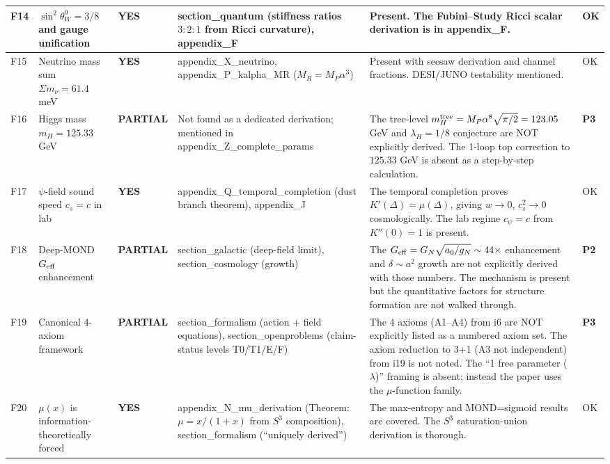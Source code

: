 \documentclass[11pt,a4paper]{article}
\newcommand{\YES}{\textcolor{yes}{\textbf{YES}}}
\newcommand{\PARTIAL}{\textcolor{partial}{\textbf{PARTIAL}}}
\begin{document}
\begin{longtable}{|p{0.5cm}|p{3.5cm}|p{1.2cm}|p{3.5cm}|p{4.5cm}|p{1cm}|}
F14 & $\sin^2\theta_W^0 = 3/8$ and gauge unification &
\YES &
section\_quantum (stiffness ratios $3:2:1$ from Ricci curvature), appendix\_F &
Present. The Fubini--Study Ricci scalar derivation is in appendix\_F. &
OK \\
\hline

F15 & Neutrino mass sum $\Sigma m_\nu = 61.4$ meV &
\YES &
appendix\_X\_neutrino, appendix\_P\_kalpha\_MR ($M_R = M_P\alpha^3$) &
Present with seesaw derivation and channel fractions. DESI/JUNO testability mentioned. &
OK \\
\hline

F16 & Higgs mass $m_H = 125.33$ GeV &
\PARTIAL &
Not found as a dedicated derivation; mentioned in appendix\_Z\_complete\_params &
The tree-level $m_H^{\rm tree} = M_P\alpha^8\sqrt{\pi/2} = 123.05$ GeV and $\lambda_H = 1/8$ conjecture are NOT explicitly derived. The 1-loop top correction to $125.33$ GeV is absent as a step-by-step calculation. &
\textbf{P3} \\
\hline

F17 & $\psi$-field sound speed $c_s = c$ in lab &
\YES &
appendix\_Q\_temporal\_completion (dust branch theorem), appendix\_J &
The temporal completion proves $K'(\Delta) = \mu(\Delta)$, giving $w \to 0$, $c_s^2 \to 0$ cosmologically. The lab regime $c_\psi = c$ from $K''(0) = 1$ is present. &
OK \\
\hline

F18 & Deep-MOND $G_{\rm eff}$ enhancement &
\PARTIAL &
section\_galactic (deep-field limit), section\_cosmology (growth) &
The $G_{\rm eff} = G_N\sqrt{a_0/g_N} \sim 44\times$ enhancement and $\delta \sim a^2$ growth are not explicitly derived with those numbers. The mechanism is present but the quantitative factors for structure formation are not walked through. &
\textbf{P2} \\
\hline

F19 & Canonical 4-axiom framework &
\PARTIAL &
section\_formalism (action + field equations), section\_openproblems (claim-status levels T0/T1/E/F) &
The 4 axioms (A1--A4) from i6 are NOT explicitly listed as a numbered axiom set. The axiom reduction to 3+1 (A3 not independent) from i19 is not noted. The ``1 free parameter ($\lambda$)'' framing is absent; instead the paper uses the $\mu$-function family. &
\textbf{P3} \\
\hline

F20 & $\mu(x)$ is information-theoretically forced &
\YES &
appendix\_N\_mu\_derivation (Theorem: $\mu = x/(1+x)$ from $S^3$ composition), section\_formalism (``uniquely derived'') &
The max-entropy and MOND=sigmoid results are covered. The $S^3$ saturation-union derivation is thorough. &
OK \\
\hline


\end{longtable}
\end{document}

